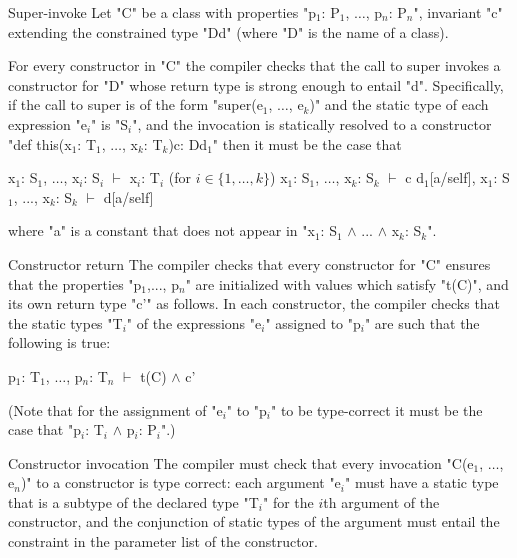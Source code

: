 \begin{staticrule}{Super-invoke}
   Let \xcd"C" be a class with properties
   \xcdmath"p$_1$: P$_1$, $\dots$, p$_n$: P$_n$", invariant \xcd"c"
   extending the constrained type \xcd"D{d}" (where \xcd"D" is the name of a class).

   For every constructor in \xcd"C" the compiler checks that the call to
   super invokes a constructor for \xcd"D" whose return type is strong enough
   to entail \xcd"d". Specifically, if the call to super is of the form 
     \xcdmath"super(e$_1$, $\dots$, e$_k$)"
   and the static type of each expression \xcdmath"e$_i$" is
   \xcdmath"S$_i$", and the invocation
   is statically resolved to a constructor
\xcdmath"def this(x$_1$: T$_1$, $\dots$, x$_k$: T$_k$){c}: D{d$_1$}"
   then it must be the case that 
\begin{xtenmath}
x$_1$: S$_1$, $\dots$, x$_i$: S$_i$ $\vdash$ x$_i$: T$_i$  (for $i \in \{1, \dots, k\}$)
x$_1$: S$_1$, $\dots$, x$_k$: S$_k$ $\vdash$ c  
d$_1$[a/self], x$_1$: S$_1$, ..., x$_k$: S$_k$ $\vdash$ d[a/self]      
\end{xtenmath}
\noindent where \xcd"a" is a constant that does not appear in 
\xcdmath"x$_1$: S$_1$ $\wedge$ ... $\wedge$ x$_k$: S$_k$".
\end{staticrule}

\begin{staticrule}{Constructor return}
   The compiler checks that every constructor for \xcd"C" ensures that
   the properties \xcdmath"p$_1$,..., p$_n$" are initialized with values which satisfy
   \xcdmath"t(C)", and its own return type \xcd"c'" as follows.  In each constructor, the
   compiler checks that the static types \xcdmath"T$_i$" of the expressions \xcdmath"e$_i$"
   assigned to \xcdmath"p$_i$" are such that the following is
   true:
\begin{xtenmath}
p$_1$: T$_1$, $\dots$, p$_n$: T$_n$ $\vdash$ t(C) $\wedge$ c'     
\end{xtenmath}
\end{staticrule}
(Note that for the assignment of \xcdmath"e$_i$" to \xcdmath"p$_i$"
to be type-correct it must be the
    case that \xcdmath"p$_i$: T$_i$ $\wedge$ p$_i$: P$_i$".) 


\begin{staticrule}{Constructor invocation}
The compiler must check that every invocation \xcdmath"C(e$_1$, $\dots$, e$_n$)" to a
constructor is type correct: each argument \xcdmath"e$_i$" must have a static type
that is a subtype of the declared type \xcdmath"T$_i$" for the $i$th
argument of the
constructor, and the conjunction of static types of the argument must
entail the constraint in the parameter list of the constructor.
\end{staticrule}







